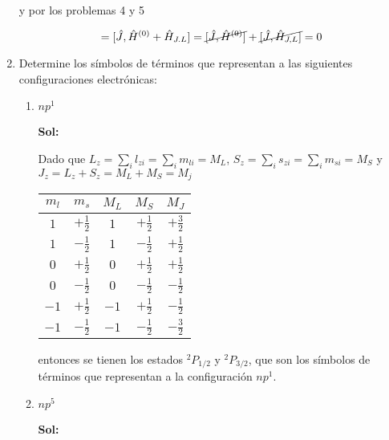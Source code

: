 \documentclass[12pt,a4paper]{article}
\begin{document}
\begin{enumerate}
y por los problemas 4 y 5

\begin{equation*}
    [\hat{J},\hat{H}]= [\hat{J}, \hat{H}^{(0)} + \hat{H}_{J.L}] = \cancel{[\hat{J},\hat{H}^{(0)}]} + \cancel{[\hat{J},\hat{H}_{J,L}]} = 0
\end{equation*}



\newpage




\item Determine los símbolos de términos que representan a las siguientes configuraciones electrónicas:

\begin{enumerate}
    \item $np^1$
    
    \textbf{Sol:}
    
    Dado que $L_z = \sum_i l_{zi} = \sum_i m_{li} = M_L$, $S_z = \sum_i s_{zi} = \sum_i m_{si} = M_S$ y $J_z = L_z + S_z = M_L+ M_S = M_j$
    
    \begin{table}[h!]
        \centering
        \begin{tabular}{|c|c|c|c|c|}
        \hline
            $m_l$ & $m_s$ & $M_L$ & $M_S$ & $M_J$  \\
            \hline
             $1$ & $+\frac{1}{2}$ & $1$ & $+\frac{1}{2}$ &$+\frac{3}{2}$\\
             $1$ & $-\frac{1}{2}$ &$1$ & $-\frac{1}{2}$ &$+\frac{1}{2}$\\
             $0$ & $+\frac{1}{2}$ &$0$ & $+\frac{1}{2}$ &$+\frac{1}{2}$\\
             $0$ & $-\frac{1}{2}$ & $0$ & $-\frac{1}{2}$ &$-\frac{1}{2}$\\
             $-1$ & $+\frac{1}{2}$ & $-1$ & $+\frac{1}{2}$ &$-\frac{1}{2}$\\
             $-1$ & $-\frac{1}{2}$ &  $-1$ & $-\frac{1}{2}$ &$-\frac{3}{2}$\\
             \hline
        \end{tabular}
    \end{table}
    
    entonces se tienen los estados $^2P_{1/2}$ y $^2P_{3/2}$, que son los símbolos de términos que representan a la configuración $np^1$.
    

    
    \item $np^5$
    
    \textbf{Sol:}
    

\end{enumerate}
\end{enumerate}
\end{document}

